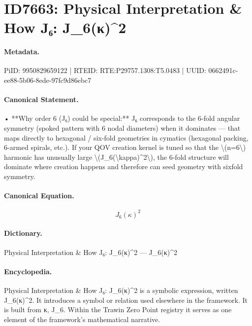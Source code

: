 \section*{ID7663: Physical Interpretation \& How J₆: J\_6(κ)\textasciicircum{}2}
\paragraph{Metadata.}
PiID: 9950829659122 | RTEID: RTE:P29757.1308:T5.0483 | UUID: 0662491c-ee88-5b06-8ede-97fc9d86ebc7

\paragraph{Canonical Statement.}
• **Why order 6 (J₆) could be special:** J₆ corresponds to the 6-fold angular symmetry (spoked pattern with 6 nodal diameters) when it dominates — that maps directly to hexagonal / six-fold geometries in cymatics (hexagonal packing, 6-armed spirals, etc.). If your QOV creation kernel is tuned so that the \textbackslash{}(n=6\textbackslash{}) harmonic has unusually large \textbackslash{}(J\_6(\textbackslash{}kappa)\textasciicircum{}2\textbackslash{}), the 6-fold structure will dominate where creation happens and therefore can seed geometry with sixfold symmetry.

\paragraph{Canonical Equation.}
\[
J_6(\kappa)^2
\]

\paragraph{Dictionary.}
Physical Interpretation \& How J₆: J\_6(κ)\textasciicircum{}2 — J\_6(κ)\textasciicircum{}2

\paragraph{Encyclopedia.}
Physical Interpretation \& How J₆: J\_6(κ)\textasciicircum{}2 is a symbolic expression, written J\_6(κ)\textasciicircum{}2. It introduces a symbol or relation used elsewhere in the framework. It is built from κ, J\_6. Within the Trawin Zero Point registry it serves as one element of the framework's mathematical narrative.
